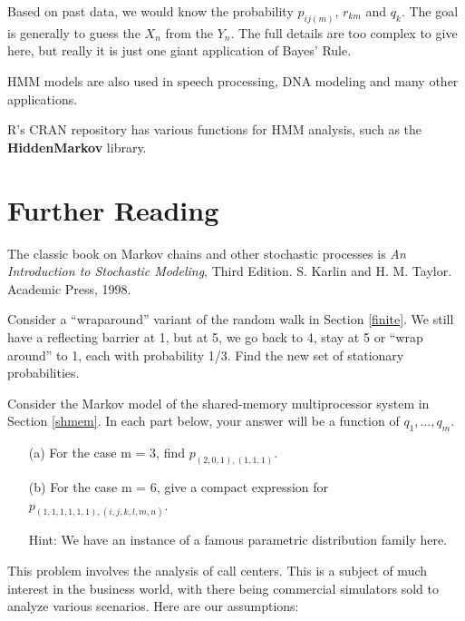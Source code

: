 Based on past data, we would know the probability $p_{ij(m)}$, $r_{km}$
and $q_k$.  The goal is generally to guess the $X_n$ from the $Y_n$.
The full details are too complex to give here, but really it is just one
giant application of Bayes' Rule.

HMM models are also used in speech processing, DNA modeling and many
other applications.

R's CRAN repository has various functions for HMM analysis, such as the
{\bf HiddenMarkov} library.

\section{Further Reading}

The classic book on Markov chains and other stochastic processes is {\it
An Introduction to Stochastic Modeling}, Third Edition.  S. Karlin and
H. M. Taylor.  Academic Press, 1998.

\startproblemset

\oneproblem
Consider a ``wraparound'' variant of the random walk in Section
\ref{finite}.  We still have a reflecting barrier at 1, but at 5, we go
back to 4, stay at 5 or ``wrap around'' to 1, each with probability 1/3.
Find the new set of stationary probabilities.

\oneproblem
Consider the Markov model of the shared-memory multiprocessor system 
in Section \ref{shmem}.  In each part below, your answer will be a function of 
$q_1,...,q_m$.

\begin{itemize}

\item [(a)] For the case m = 3, find $p_{(2,0,1),(1,1,1)}$.

\item [(b)] For the case m = 6, give a compact expression for
$p_{(1,1,1,1,1,1),(i,j,k,l,m,n)}$.

Hint:  We have an instance of a famous parametric distribution family here.

\end{itemize}

\oneproblem
This problem involves the analysis of call centers. This is a subject  
of much interest in the business world, with there being commercial 
simulators sold to analyze various scenarios. Here are our assumptions:

